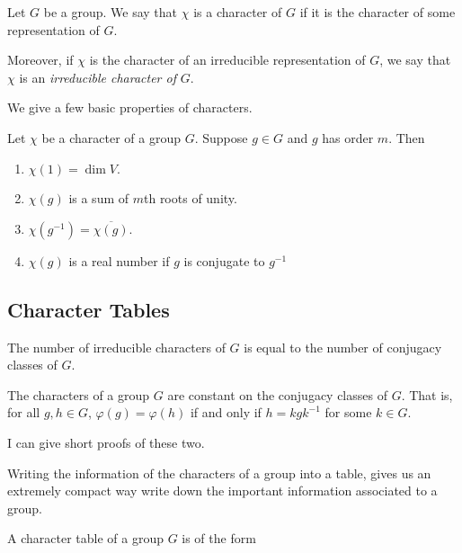 \begin{definition}
    Let $G$ be a group. We say that $\chi$ is a character of $G$ if it is the character of some representation of 
    $G$.

    Moreover, if $\chi$ is the character of an irreducible representation of $G$, we say that $\chi$ is an
    \emph{irreducible character of} $G$.
\end{definition}



We give a few basic properties of characters.
\begin{theorem}
    Let $\chi$ be a character of a group $G$. Suppose $g \in G$ and $g$ has order $m$. Then
    \begin{enumerate}
        \item $\chi(1) = \dim V$.
        \item $\chi(g)$ is a sum of $m$th roots of unity.
        \item $\chi(g^{-1}) = \overline{\chi(g)}$.
        \item $\chi(g)$ is a real number if $g$ is conjugate  to $g^{-1}$
    \end{enumerate}
\end{theorem}




\subsection{Character Tables}
    


\begin{theorem}
    The number of irreducible characters of $G$ is equal to the number of conjugacy classes of $G$.
\end{theorem}

\begin{theorem}
    The characters of a group $G$ are constant on the conjugacy classes of $G$. That is, for all $g,h \in G$, 
    $\varphi(g) = \varphi(h)$ if and only if $h = kgk^{-1}$ for some $k \in G$.
\end{theorem}

I can give short proofs of these two.

    Writing the information of the characters of a group into a table, gives us an extremely compact way write down 
    the important information associated to a group.
    

\begin{definition}
    A character table of a group $G$ is of the form 
    

\end{definition}



